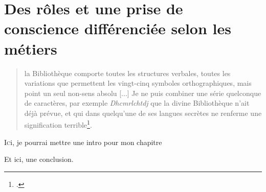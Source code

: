 \chapter[PDV métier]{\label{II-B}Des rôles et une prise de conscience différenciée selon les métiers }

\begin{quote}
	\og la Bibliothèque comporte toutes les structures verbales, toutes les variations que permettent les vingt-cinq symboles orthographiques, mais point un seul non-sens absolu [...] Je ne puis combiner une série quelconque de caractères, par exemple	\textit{Dhcmrlchtdj} que la divine Bibliothèque n’ait déjà prévue, et qui dans quelqu’une de ses langues secrètes ne renferme
	une signification terrible\footcite{borgesBibliothequeBabel1963}.\fg
\end{quote}

\lettrine{I}ci, je pourrai mettre une intro pour mon chapitre






\bigskip
\bigskip
\bigskip

Et ici, une conclusion.